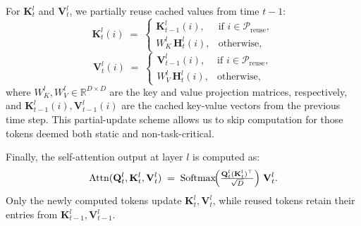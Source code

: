\noindent
For \(\mathbf{K}_t^l\) and \(\mathbf{V}_t^l\), we partially reuse cached values from time \(t-1\):
\begin{equation}
\label{eq:k_formula}
\mathbf{K}_t^l(i) \;=\; 
\begin{cases}
\mathbf{K}_{t-1}^l(i), & \text{if } i\in \mathcal{P}_{\mathrm{reuse}},\\
W_K^l\,\mathbf{H}_t^l(i), & \text{otherwise},
\end{cases}
\end{equation}
\begin{equation}
\label{eq:v_formula}
\mathbf{V}_t^l(i) \;=\; 
\begin{cases}
\mathbf{V}_{t-1}^l(i), & \text{if } i\in \mathcal{P}_{\mathrm{reuse}},\\
W_V^l\,\mathbf{H}_t^l(i), & \text{otherwise},
\end{cases}
\end{equation}
where \(W_K^l, W_V^l\in\mathbb{R}^{D\times D}\) are the key and value projection matrices, respectively, and \(\mathbf{K}_{t-1}^l(i), \mathbf{V}_{t-1}^l(i)\) are the cached key-value vectors from the previous time step. This partial-update scheme allows us to skip computation for those tokens deemed both static and non-task-critical.

Finally, the self-attention output at layer \(l\) is computed as:
\begin{equation}
\label{eq:attn_formula}
\mathrm{Attn}(\mathbf{Q}_t^l,\mathbf{K}_t^l,\mathbf{V}_t^l) \;=\; 
\mathrm{Softmax}\!\Bigl(\tfrac{\mathbf{Q}_t^l(\mathbf{K}_t^l)^\top}{\sqrt{D}}\Bigr)\;\mathbf{V}_t^l.
\end{equation}
Only the newly computed tokens update \(\mathbf{K}_t^l,\mathbf{V}_t^l\), while reused tokens retain their entries from \(\mathbf{K}_{t-1}^l,\mathbf{V}_{t-1}^l\). 

